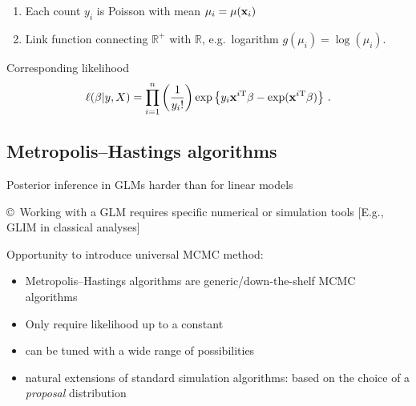 \begin{slide}[label=LLintro]
\end{slide}\begin{slide}

\begin{enumerate}
\item Each count $y_i$ is Poisson with mean $\mu_i=\mu(\mathbf{x}_i)$ 
\item Link function
connecting $\mathbb{R}^+$ with $\mathbb{R}$, e.g.~logarithm
$g(\mu_i)=\log(\mu_i)$. 
\end{enumerate}

\pause\vs Corresponding likelihood 
\small
$$
\ell(\beta|y,X)=\prod_{i=1}^n\left(\frac{1}{y_i!}\right)\exp\left\{
y_i \mathbf{x}^{i\mathrm{T}}\beta-\exp(\mathbf{x}^{i\mathrm{T}}\beta)\right\}\,.
$$
\normalsize

\end{slide}\subsection{Metropolis--Hastings algorithms}\begin{slide}[label=MCMC.0]

\hfill\hyperlink{Convass}{}

\vs Posterior inference in GLMs harder than for linear models

\pause
\vs \copyright~Working with a GLM requires specific numerical or simulation tools 
[E.g., {\sf GLIM} in classical analyses] 

\pause
\vs Opportunity to introduce universal MCMC method: 

\end{slide}\begin{slide}

\begin{itemize}
\item Metropolis--Hastings algorithms are generic/down-the-shelf MCMC algorithms 
\item Only require likelihood up to a constant 

\item can be tuned with a wide range of possibilities 

\item natural extensions of standard simulation algorithms: %
based on the choice of a {\em proposal} 
distribution 
\end{itemize}


\end{slide}
